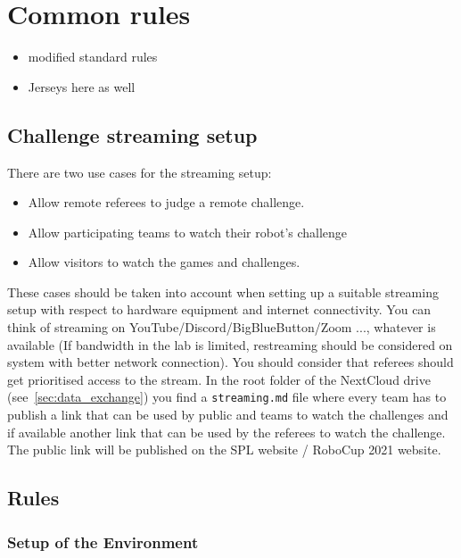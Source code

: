 \section{Common rules}
\label{sec:Common_rules}

\begin{itemize}

    \item modified standard rules
    \item Jerseys here as well
\end{itemize}

\subsection{Challenge streaming setup}
\label{sec:streaming_setup}

There are two use cases for the streaming setup: 
\begin{itemize}
    \item Allow remote referees to judge a remote challenge.
    \item Allow participating teams to watch their robot's challenge
    \item Allow visitors to watch the games and challenges.
\end{itemize}

These cases should be taken into account when setting up a suitable streaming setup with respect to hardware equipment and internet connectivity.
You can think of streaming on YouTube/Discord/BigBlueButton/Zoom ..., whatever is available (If bandwidth in the lab is limited, restreaming should be considered on system with better network connection). You should consider that referees should get prioritised access to the stream.  
In the root folder of the NextCloud drive (see~\ref{sec:data_exchange}) you find a \texttt{streaming.md} file where every team has to publish a link that can be used by public and teams to watch the challenges and if available another link that can be used by the referees to watch the challenge. The public link will be published on the SPL website / RoboCup 2021 website.


\subsection{Rules}
\label{sec:rules}

\subsubsection{Setup of the Environment}
\label{sec:environment_setup}
